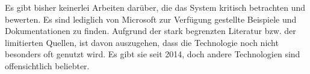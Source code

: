 Es gibt bisher keinerlei Arbeiten darüber, die das System kritisch betrachten und bewerten. Es sind lediglich von Microsoft zur Verfügung gestellte Beispiele und Dokumentationen zu finden. Aufgrund der stark begrenzten Literatur bzw. der limitierten Quellen, ist davon auszugehen, dass die Technologie noch nicht besonders oft genutzt wird. Es gibt sie seit 2014, doch andere Technologien sind offensichtlich beliebter.



\ifCLASSOPTIONcaptionsoff
  \newpage
\fi